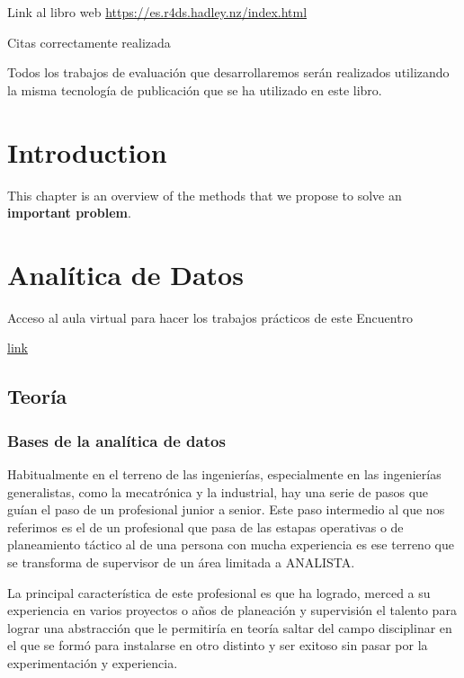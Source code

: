 \documentclass[]{article}
\begin{document}
Link al libro web \url{https://es.r4ds.hadley.nz/index.html}

Citas correctamente realizada \autocite{wickham2018r}

Todos los trabajos de evaluación que desarrollaremos serán realizados
utilizando la misma tecnología de publicación que se ha utilizado en
este libro.

\section{Introduction}\label{introduction}

This chapter is an overview of the methods that we propose to solve an
\textbf{important problem}.

\section{Analítica de Datos}\label{Encuentro_1}

Acceso al aula virtual para hacer los trabajos prácticos de este
Encuentro

\href{https://classroom.google.com/c/MTIxNDQ1ODYyMTM4?cjc=yegjvv2}{link}

\subsection{Teoría}\label{teoruxeda}

\subsubsection{Bases de la analítica de
datos}\label{bases-de-la-analuxedtica-de-datos}

Habitualmente en el terreno de las ingenierías, especialmente en las
ingenierías generalistas, como la mecatrónica y la industrial, hay una
serie de pasos que guían el paso de un profesional junior a senior. Este
paso intermedio al que nos referimos es el de un profesional que pasa de
las estapas operativas o de planeamiento táctico al de una persona con
mucha experiencia es ese terreno que se transforma de supervisor de un
área limitada a ANALISTA.

La principal característica de este profesional es que ha logrado,
merced a su experiencia en varios proyectos o años de planeación y
supervisión el talento para lograr una abstracción que le permitiría en
teoría saltar del campo disciplinar en el que se formó para instalarse
en otro distinto y ser exitoso sin pasar por la experimentación y
experiencia.
\end{document}
